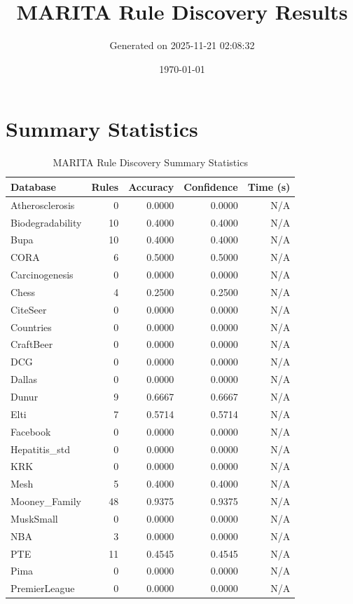 \documentclass[11pt,a4paper]{article}
\title{MARITA Rule Discovery Results}
\author{Generated on 2025-11-21 02:08:32}
\date{\today}
\begin{document}
\maketitle

\section{Summary Statistics}
\begin{table}[h!]
\centering
\caption{MARITA Rule Discovery Summary Statistics}
\label{tab:marita_summary}
\begin{tabular}{|l|r|r|r|r|}
\hline
\textbf{Database} & \textbf{Rules} & \textbf{Accuracy} & \textbf{Confidence} & \textbf{Time (s)} \\
\hline
Atherosclerosis & 0 & 0.0000 & 0.0000 & N/A \\
Biodegradability & 10 & 0.4000 & 0.4000 & N/A \\
Bupa & 10 & 0.4000 & 0.4000 & N/A \\
CORA & 6 & 0.5000 & 0.5000 & N/A \\
Carcinogenesis & 0 & 0.0000 & 0.0000 & N/A \\
Chess & 4 & 0.2500 & 0.2500 & N/A \\
CiteSeer & 0 & 0.0000 & 0.0000 & N/A \\
Countries & 0 & 0.0000 & 0.0000 & N/A \\
CraftBeer & 0 & 0.0000 & 0.0000 & N/A \\
DCG & 0 & 0.0000 & 0.0000 & N/A \\
Dallas & 0 & 0.0000 & 0.0000 & N/A \\
Dunur & 9 & 0.6667 & 0.6667 & N/A \\
Elti & 7 & 0.5714 & 0.5714 & N/A \\
Facebook & 0 & 0.0000 & 0.0000 & N/A \\
Hepatitis_std & 0 & 0.0000 & 0.0000 & N/A \\
KRK & 0 & 0.0000 & 0.0000 & N/A \\
Mesh & 5 & 0.4000 & 0.4000 & N/A \\
Mooney_Family & 48 & 0.9375 & 0.9375 & N/A \\
MuskSmall & 0 & 0.0000 & 0.0000 & N/A \\
NBA & 3 & 0.0000 & 0.0000 & N/A \\
PTE & 11 & 0.4545 & 0.4545 & N/A \\
Pima & 0 & 0.0000 & 0.0000 & N/A \\
PremierLeague & 0 & 0.0000 & 0.0000 & N/A \\

\end{tabular}
\end{table}
\end{document}
